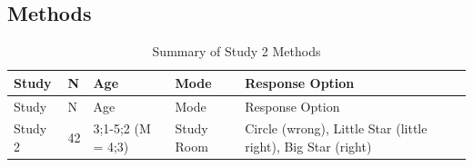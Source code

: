 \documentclass[oneside]{report}
\theoremstyle{definition}
\theoremstyle{definition}
\theoremstyle{definition}
\theoremstyle{remark}
\begin{document}
\subsection{Methods}\label{methods-3}
\begin{longtable}[]{@{}lllll@{}}
\caption{\label{tab:study2info} Summary of Study 2 Methods}\tabularnewline
\toprule
\begin{minipage}[b]{0.08\columnwidth}\raggedright\strut
Study\strut
\end{minipage} & \begin{minipage}[b]{0.04\columnwidth}\raggedright\strut
N\strut
\end{minipage} & \begin{minipage}[b]{0.21\columnwidth}\raggedright\strut
Age\strut
\end{minipage} & \begin{minipage}[b]{0.17\columnwidth}\raggedright\strut
Mode\strut
\end{minipage} & \begin{minipage}[b]{0.32\columnwidth}\raggedright\strut
Response Option\strut
\end{minipage}\tabularnewline
\midrule
\endfirsthead
\toprule
\begin{minipage}[b]{0.08\columnwidth}\raggedright\strut
Study\strut
\end{minipage} & \begin{minipage}[b]{0.04\columnwidth}\raggedright\strut
N\strut
\end{minipage} & \begin{minipage}[b]{0.21\columnwidth}\raggedright\strut
Age\strut
\end{minipage} & \begin{minipage}[b]{0.17\columnwidth}\raggedright\strut
Mode\strut
\end{minipage} & \begin{minipage}[b]{0.32\columnwidth}\raggedright\strut
Response Option\strut
\end{minipage}\tabularnewline
\midrule
\endhead
\begin{minipage}[t]{0.08\columnwidth}\raggedright\strut
Study 2\strut
\end{minipage} & \begin{minipage}[t]{0.04\columnwidth}\raggedright\strut
42\strut
\end{minipage} & \begin{minipage}[t]{0.21\columnwidth}\raggedright\strut
3;1-5;2 (M = 4;3)\strut
\end{minipage} & \begin{minipage}[t]{0.17\columnwidth}\raggedright\strut
Study Room\strut
\end{minipage} & \begin{minipage}[t]{0.32\columnwidth}\raggedright\strut
Circle (wrong), Little Star (little right), Big Star (right)\strut
\end{minipage}\tabularnewline
\bottomrule
\end{longtable}
\end{document}

